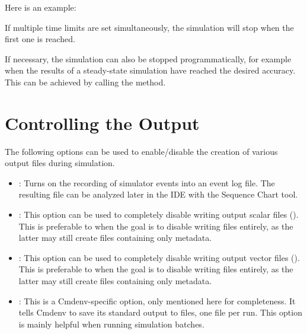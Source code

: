 Here is an example:


If multiple time limits are set simultaneously, the simulation will stop when
the first one is reached.

If necessary, the simulation can also be stopped programmatically, for example
when the results of a steady-state simulation have reached the desired accuracy.
This can be achieved by calling the  method.


\section{Controlling the Output}
\label{sec:run-sim:output-control}

The following options can be used to enable/disable the creation of various
output files during simulation.

\begin{itemize}
  \item {} : Turns on the recording of simulator
        events into an event log file. The resulting  file can be
        analyzed later in the IDE with the Sequence Chart tool.

  \item {} :  This option can be used to completely
        disable writing output scalar files (). This is preferable to
         when the goal is to disable writing  files
        entirely, as the latter may still create  files containing only metadata.

  \item {} : This option can be used to completely
        disable writing output vector files (). This is preferable to
         when the goal is to disable writing  files
        entirely, as the latter may still create  files containing only metadata.

  \item {} : This is a Cmdenv-specific option,
        only mentioned here for completeness. It tells Cmdenv to save its
        standard output to files, one file per run. This option is mainly
        helpful when running simulation batches.

\end{itemize}

